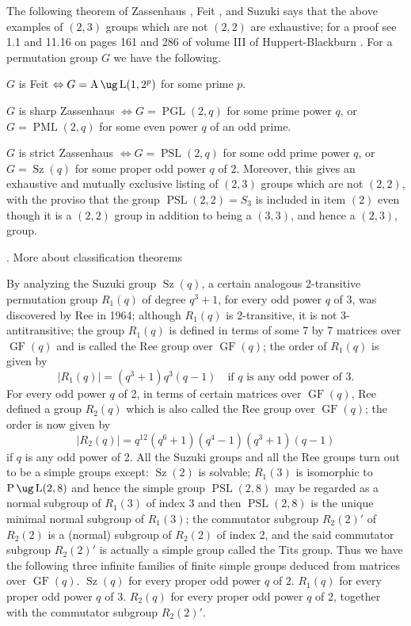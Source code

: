 The following theorem of Zassenhaus \cite{Z1}, Feit 
\cite{F}, and 
Suzuki \cite{Su1} says that the above
examples of $(2,3)$ groups which are not $(2,2)$ are 
exhaustive; for a proof 
see 1.1 and 11.16 on pages 161 and  286 of volume III of 
Huppert-Blackburn \cite{HB}.
For a permutation group $G$ we have the following.
\roster
\item \<$G$ is Feit $\Leftrightarrow G=\operatorname{A}\ug 
\operatorname{L}
(1,2^p)$ for some prime $p$.
\item \<$G$ is sharp Zassenhaus $\Leftrightarrow 
G=\operatorname{PGL}(2,q)$ for some prime
power $q$, or $G=\operatorname{PML}(2,q)$ for some even 
power $q$ of an odd prime.
\item \<$G$ is strict Zassenhaus $\Leftrightarrow 
G=\operatorname{PSL}(2,q)$ for some odd 
prime power $q$, or $G=\operatorname{Sz}(q)$ for some 
proper odd power $q$ of $2$.
\endroster
Moreover, this gives an exhaustive and mutually exclusive 
listing of
$(2,3)$ groups which are not $(2,2)$, with the proviso 
that the group
$\operatorname{PSL}(2,2)=S_3$ is included in item $(2)$ 
even though it is a $(2,2)$
group in addition to being a $(3,3)$, and hence a $(2,3)$, 
group.
\endproclaim

. More about classification theorems\endheading

By analyzing the Suzuki group $\operatorname{Sz}(q)$,
a certain analogous 2-transitive permutation group 
$R_1(q)$ of degree 
$q^3+1$, for every odd power $q$ of 3,
was discovered by Ree \cite{R} in 1964; although $R_1(q)$ 
is 2-transitive, 
it is not 3-antitransitive; the group $R_1(q)$ is defined 
in terms of some 
7 by 7 matrices over
$\operatorname{GF}(q)$ and is called the Ree group over 
$\operatorname{GF}(q)$; the order of $R_1(q)$ is given
by
$$
|R_1(q)|=(q^3+1)q^3(q-1)\quad\text{if $q$ is any odd power 
of 3}.
$$
For every odd power
$q$ of 2, in terms of certain matrices over 
$\operatorname{GF}(q)$, Ree defined a group
$R_2(q)$ which is also called the Ree group over 
$\operatorname{GF}(q)$; the order is now
given by
$$
|R_2(q)|=q^{12}(q^6+1)(q^4-1)(q^3+1)(q-1)
$$
if $q$ is any odd power of 2.
All the Suzuki groups and all the Ree groups turn out to 
be a simple groups 
except: $\operatorname{Sz}(2)$ is solvable; $R_1(3)$ is 
isomorphic to 
$\operatorname{P}\ug \operatorname{L}(2,8)$ and hence
the simple group $\operatorname{PSL}(2,8)$ 
may be regarded as a normal subgroup
of $R_1(3)$ of index 3 and then $\operatorname{PSL}(2,8)$ 
is the unique minimal normal
subgroup
of $R_1(3)$; the commutator subgroup $R_2(2)'$ of $R_2(2)$ 
is a (normal)
subgroup of $R_2(2)$ of index 2, and the said commutator 
subgroup $R_2(2)'$
is actually a simple group called the Tits group.
Thus we have the following three infinite families of 
finite simple
groups deduced from matrices over $\operatorname{GF}(q)$. 
{} $\operatorname{Sz}(q)$ 
for every proper odd power $q$ of $2$.
$R_1(q)$ for every proper odd power $q$ of $3$.
$R_2(q)$ for every proper odd power $q$ of $2$, together 
with the commutator 
subgroup $R_2(2)'$.

